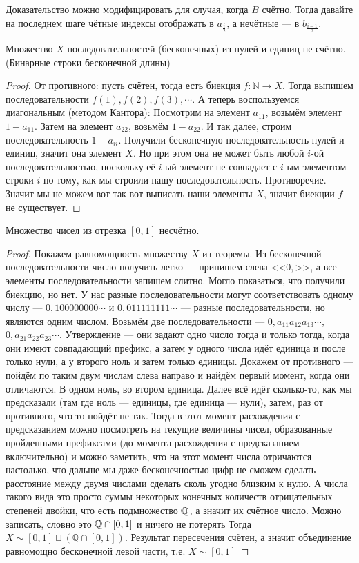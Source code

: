 \begin{remark}
	Доказательство можно модифицировать для случая, когда $B$ счётно. Тогда давайте на последнем шаге чётные индексы отображать в $a_{\frac{i}2}$, а нечётные --- в $b_{\frac{i-1}2}$. 
\end{remark}
\begin{theorem}
	Множество $X$ последовательностей (бесконечных) из нулей и единиц не счётно. (Бинарные строки бесконечной длины)
\end{theorem}
\begin{proof}
	От противного: пусть счётен, тогда есть биекция $f \colon \mathbb{N} \to X$. Тогда выпишем последовательности $f(1), f(2), f(3), \cdots$. 
	А теперь воспользуемся диагональным (методом Кантора): Посмотрим на элемент $a_{11}$, возьмём элемент $1 - a_{11}$. Затем на элемент $a_{22}$, возьмём $1 - a_{22}$. И так далее, строим последовательность $1 - a_{ii}$. Получили бесконечную последовательность нулей и единиц, значит она элемент $X$. Но при этом она не может быть любой $i$-ой последовательностью, поскольку её $i$-ый элемент не совпадает с $i$-ым элементом строки $i$ по тому, как мы строили нашу последовательность.
	Противоречие. Значит мы не можем вот так вот выписать наши элементы $X$, значит биекции $f$ не существует. 
\end{proof}
\begin{consequence}
	Множество чисел из отрезка $[0, 1]$ несчётно.
\end{consequence}
\begin{proof}
	Покажем равномощность множеству $X$ из теоремы. Из бесконечной последовательности число получить легко --- припишем слева <<$0,$>>, а все элементы последовательности запишем слитно. Могло показаться, что получили биекцию, но нет. У нас разные последовательности могут соответствовать одному числу --- $0,100000000\cdots$ и $0,011111111\cdots$  --- разные последовательности, но являются одним числом. 
	Возьмём две последовательности --- $0,a_{11}a_{12}a_{13}\cdots$, $0,a_{21}a_{22}a_{23}\cdots$. Утверждение --- они задают одно число тогда и только тогда, когда они имеют совпадающий префикс, а затем у одного числа идёт единица и после только нули, а у второго ноль и затем только единицы.
	Докажем от противного --- пойдём по таким двум числам слева направо и найдём первый момент, когда они отличаются. В одном ноль, во втором единица. Далее всё идёт сколько-то, как мы предсказали (там где ноль --- единицы, где единица --- нули), затем, раз от противного, что-то пойдёт не так. Тогда в этот момент расхождения с предсказанием можно посмотреть на текущие величины чисел, образованные пройденными префиксами (до момента расхождения с предсказанием включительно) и можно заметить, что на этот момент числа отричаются настолько, что дальше мы даже бесконечностью цифр не сможем сделать расстояние между двумя числами сделать сколь угодно близким к нулю. 
	А числа такого вида это просто суммы некоторых конечных количеств отрицательных степеней двойки, что есть подмножество $\mathbb{Q}$, а значит их счётное число. Можно записать, словно это $\mathbb{Q} \cap [0, 1]$ и ничего не потерять
	Тогда $X \sim [0, 1] \sqcup (\mathbb{Q} \cap [0, 1])$. Результат пересечения счётен, а значит объединение равномощно бесконечной левой части, т.е. $X \sim [0, 1]$
\end{proof}
